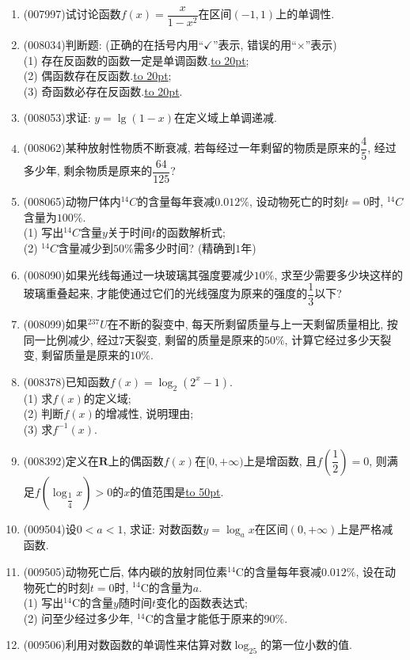 \documentclass[10pt,a4paper]{article}
\newcommand{\blank}[1]{\underline{\hbox to #1pt{}}}
\begin{document}
\begin{enumerate}[1.]
\item {\tiny (007997)}试讨论函数$f(x)=\dfrac x{1-x^2}$在区间$(-1,1)$上的单调性.
\item {\tiny (008034)}判断题: (正确的在括号内用``$\checkmark$''表示, 错误的用``$\times$''表示)\\
(1) 存在反函数的函数一定是单调函数.\blank{20};\\
(2) 偶函数存在反函数.\blank{20};\\
(3) 奇函数必存在反函数.\blank{20}.
\item {\tiny (008053)}求证: $y=\lg(1-x)$在定义域上单调递减.
\item {\tiny (008062)}某种放射性物质不断衰减, 若每经过一年剩留的物质是原来的$\dfrac 45$, 经过多少年, 剩余物质是原来的$\dfrac{64}{125}$?
\item {\tiny (008065)}动物尸体内$^{14}C$的含量每年衰减$0.012\%$, 设动物死亡的时刻$t=0$时, $^{14}C$含量为$100\%$.\\
(1) 写出$^{14}C$含量$y$关于时间$t$的函数解析式;\\
(2) $^{14}C$含量减少到$50\%$需多少时间? (精确到$1$年)
\item {\tiny (008090)}如果光线每通过一块玻璃其强度要减少$10\%$, 求至少需要多少块这样的玻璃重叠起来, 才能使通过它们的光线强度为原来的强度的$\dfrac 13$以下?
\item {\tiny (008099)}如果$^{237}U$在不断的裂变中, 每天所剩留质量与上一天剩留质量相比, 按同一比例减少, 经过$7$天裂变, 剩留的质量是原来的$50\%$, 计算它经过多少天裂变, 剩留质量是原来的$10\%$.
\item {\tiny (008378)}已知函数$f(x)=\log _2(2^x-1)$.\\
(1) 求$f(x)$的定义域;\\
(2) 判断$f(x)$的增减性, 说明理由;\\
(3) 求$f^{-1}(x)$.
\item {\tiny (008392)}定义在$\mathbf{R}$上的偶函数$f(x)$在$[0,+\infty)$上是增函数, 且$f(\dfrac 12)=0$, 则满足$f(\log _{\dfrac 14}x)>0$的$x$的值范围是\blank{50}.
\item {\tiny (009504)}设$0<a<1$, 求证: 对数函数$y=\log_ax$在区间$(0, +\infty)$上是严格减函数.
\item {\tiny (009505)}动物死亡后, 体内碳的放射同位素$^{14}\text{C}$的含量每年衰减$0.012\%$, 设在动物死亡的时刻$t=0$时, $^{14}\text{C}$的含量为$a$.\\
(1) 写出$^{14}\text{C}$的含量$y$随时间$t$变化的函数表达式;\\
(2) 问至少经过多少年, $^{14}\text{C}$的含量才能低于原来的$90\%$.
\item {\tiny (009506)}利用对数函数的单调性来估算对数$\log_25$的第一位小数的值.

\end{enumerate}
\end{document}

